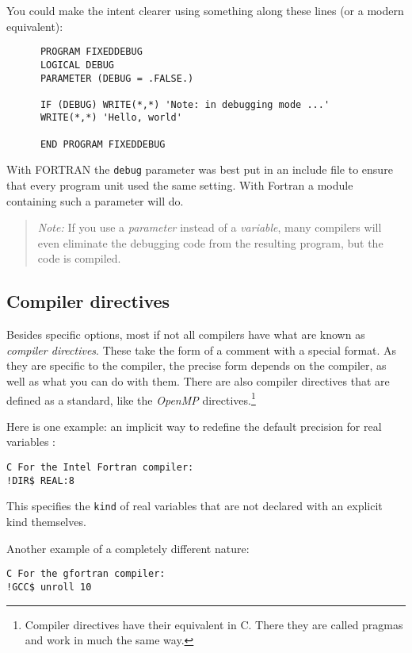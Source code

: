 You could make the intent clearer using something along these lines (or a modern equivalent):
\begin{verbatim}
      PROGRAM FIXEDDEBUG
      LOGICAL DEBUG
      PARAMETER (DEBUG = .FALSE.)

      IF (DEBUG) WRITE(*,*) 'Note: in debugging mode ...'
      WRITE(*,*) 'Hello, world'

      END PROGRAM FIXEDDEBUG
\end{verbatim}

With FORTRAN the \verb+debug+ parameter was best put in an include file to ensure that every program unit
used the same setting. With Fortran a module containing such a parameter will do.

\begin{quote}
\emph{Note:} If you use a \emph{parameter} instead of a \emph{variable}, many compilers will even eliminate
the debugging code from the resulting program, but the code is compiled.
\end{quote}


\subsection{Compiler directives}
Besides specific options, most if not all compilers have what are known as \emph{compiler directives}. These
take the form of a comment with a special format. As they are specific to the compiler, the precise form
depends on the compiler, as well as what you can do with them. There are also compiler directives that
are defined as a standard, like the \emph{OpenMP} directives.\footnote{Compiler directives have their
equivalent in C. There they are called pragmas and work in much the same way.}

Here is one example: an implicit way to redefine the default precision for real variables \cite{IntelRealDirective}:

\begin{verbatim}
C For the Intel Fortran compiler:
!DIR$ REAL:8
\end{verbatim}

This specifies the \verb+kind+ of real variables that are not declared with an explicit kind themselves.

Another example of a completely different nature:

\begin{verbatim}
C For the gfortran compiler:
!GCC$ unroll 10
\end{verbatim}

